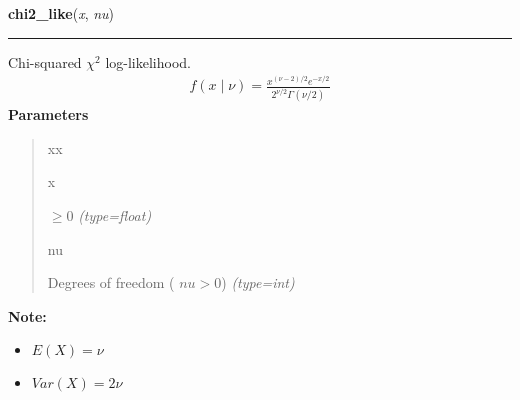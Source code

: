 \hspace{.8\funcindent}\begin{boxedminipage}{\funcwidth}

    \raggedright \textbf{chi2\_like}(\textit{x}, \textit{nu})

    \vspace{-1.5ex}

    \rule{\textwidth}{1pt}
\setlength{\parskip}{2ex}

Chi-squared $\chi^2$ log-likelihood.
\begin{equation*}\begin{split}f(x \mid \nu) = \frac{x^{(\nu-2)/2}e^{-x/2}}{2^{\nu/2}\Gamma(\nu/2)}\end{split}\end{equation*}\setlength{\parskip}{1ex}
      \textbf{Parameters}
      \vspace{-1ex}

      \begin{quote}
        \begin{Ventry}{xx}

          \item[x]


$\ge 0$
            {\it (type=float)}

          \item[nu]


Degrees of freedom ( $nu > 0$)
            {\it (type=int)}

        \end{Ventry}

      \end{quote}

\textbf{Note:} \begin{itemize}
\item {} 
$E(X)=\nu$

\item {} 
$Var(X)=2\nu$

\end{itemize}


    \end{boxedminipage}

    \label{pymc:distributions:dirichlet_like}

    \vspace{0.5ex}

